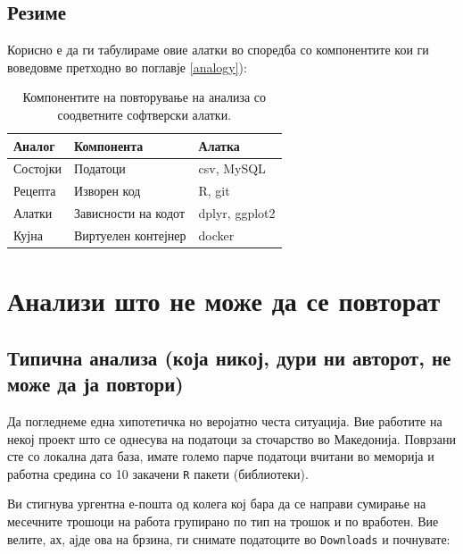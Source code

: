 \documentclass[
]{book}
\begin{document}
\hypertarget{ux440ux435ux437ux438ux43cux435}{%
\section{Резиме}\label{ux440ux435ux437ux438ux43cux435}}

Корисно е да ги табулираме овие алатки во споредба со компонентите кои ги воведовме претходно во поглавје \ref{analogy}):

\begin{table}

\caption{\label{tab:unnamed-chunk-1}Компонентите на повторување на анализа со соодветните софтверски алатки.}
\centering
\begin{tabular}[t]{l|l|l}
\hline
Аналог & Компонента & Алатка\\
\hline
Состојки & Податоци & csv, MySQL\\
\hline
Рецепта & Изворен код & R, git\\
\hline
Алатки & Зависности на кодот & dplyr, ggplot2\\
\hline
Кујна & Виртуелен контејнер & docker\\
\hline
\end{tabular}
\end{table}

\hypertarget{nogood}{%
\chapter{Анализи што не може да се повторат}\label{nogood}}

\hypertarget{typical}{%
\section{Типична анализа (која никој, дури ни авторот, не може да ја повтори)}\label{typical}}

Да погледнеме една хипотетичка но веројатно честа ситуација. Вие работите на некој проект што се однесува на податоци за сточарство во Македонија. Поврзани сте со локална дата база, имате големо парче податоци вчитани во меморија и работна средина со 10 закачени \texttt{R} пакети (библиотеки).

Ви стигнува ургентна е-пошта од колега кој бара да се направи сумирање на месечните трошоци на работа групирано по тип на трошок и по вработен. Вие велите, ах, ајде ова на брзина, ги снимате податоците во \texttt{Downloads} и почнувате:
\end{document}
